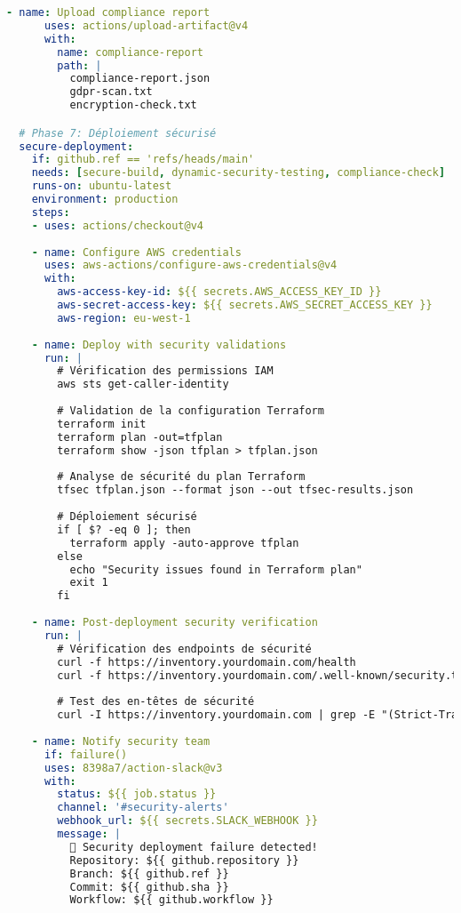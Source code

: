 \documentclass[12pt,a4paper]{report}
\begin{document}
\begin{lstlisting}[language=YAML, caption=Pipeline GitHub Actions DevSecOps complète]
    - name: Upload compliance report
      uses: actions/upload-artifact@v4
      with:
        name: compliance-report
        path: |
          compliance-report.json
          gdpr-scan.txt
          encryption-check.txt

  # Phase 7: Déploiement sécurisé
  secure-deployment:
    if: github.ref == 'refs/heads/main'
    needs: [secure-build, dynamic-security-testing, compliance-check]
    runs-on: ubuntu-latest
    environment: production
    steps:
    - uses: actions/checkout@v4
    
    - name: Configure AWS credentials
      uses: aws-actions/configure-aws-credentials@v4
      with:
        aws-access-key-id: ${{ secrets.AWS_ACCESS_KEY_ID }}
        aws-secret-access-key: ${{ secrets.AWS_SECRET_ACCESS_KEY }}
        aws-region: eu-west-1
    
    - name: Deploy with security validations
      run: |
        # Vérification des permissions IAM
        aws sts get-caller-identity
        
        # Validation de la configuration Terraform
        terraform init
        terraform plan -out=tfplan
        terraform show -json tfplan > tfplan.json
        
        # Analyse de sécurité du plan Terraform
        tfsec tfplan.json --format json --out tfsec-results.json
        
        # Déploiement sécurisé
        if [ $? -eq 0 ]; then
          terraform apply -auto-approve tfplan
        else
          echo "Security issues found in Terraform plan"
          exit 1
        fi
    
    - name: Post-deployment security verification
      run: |
        # Vérification des endpoints de sécurité
        curl -f https://inventory.yourdomain.com/health
        curl -f https://inventory.yourdomain.com/.well-known/security.txt
        
        # Test des en-têtes de sécurité
        curl -I https://inventory.yourdomain.com | grep -E "(Strict-Transport-Security|Content-Security-Policy|X-Frame-Options)"
    
    - name: Notify security team
      if: failure()
      uses: 8398a7/action-slack@v3
      with:
        status: ${{ job.status }}
        channel: '#security-alerts'
        webhook_url: ${{ secrets.SLACK_WEBHOOK }}
        message: |
          🚨 Security deployment failure detected!
          Repository: ${{ github.repository }}
          Branch: ${{ github.ref }}
          Commit: ${{ github.sha }}
          Workflow: ${{ github.workflow }}
\end{lstlisting}
\end{document}
